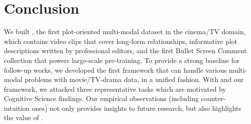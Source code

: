 \section{Conclusion}
\label{sec:conclusion}
We built \TVD, the first plot-oriented multi-modal dataset in the cinema/TV domain, which contains video clips that cover long-form relationships, informative plot descriptions written by professional editors, and the first Bullet Screen Comment collection that powers large-scale pre-training.
To provide a strong baseline for follow-up works, we developed the first framework that can handle various multi-modal problems with movie/TV-drama data, in a unified fashion.
With \TVD and our framework, we attacked three representative tasks which are motivated by Cognitive Science findings.
Our empirical observations (including counter-intuition ones) not only provides insights to future research, but also highlights the value of \TVD.

